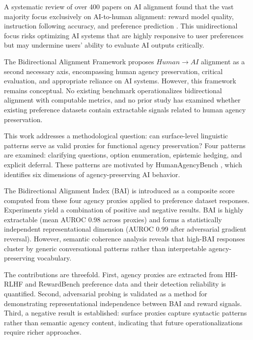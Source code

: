
A systematic review of over 400 papers on AI alignment found that the vast majority focus exclusively on AI-to-human alignment: reward model quality, instruction following accuracy, and preference prediction \citep{Shen2024}. This unidirectional focus risks optimizing AI systems that are highly responsive to user preferences but may undermine users' ability to evaluate AI outputs critically.

The Bidirectional Alignment Framework \citep{Shen2024} proposes $Human\rightarrow AI$ alignment as a second necessary axis, encompassing human agency preservation, critical evaluation, and appropriate reliance on AI systems. However, this framework remains conceptual. No existing benchmark operationalizes bidirectional alignment with computable metrics, and no prior study has examined whether existing preference datasets contain extractable signals related to human agency preservation.

This work addresses a methodological question: can surface-level linguistic patterns serve as valid proxies for functional agency preservation? Four patterns are examined: clarifying questions, option enumeration, epistemic hedging, and explicit deferral. These patterns are motivated by HumanAgencyBench \citep{HumanAgencyBench2024}, which identifies six dimensions of agency-preserving AI behavior.

The Bidirectional Alignment Index (BAI) is introduced as a composite score computed from these four agency proxies applied to preference dataset responses. Experiments yield a combination of positive and negative results. BAI is highly extractable (mean AUROC 0.98 across proxies) and forms a statistically independent representational dimension (AUROC 0.99 after adversarial gradient reversal). However, semantic coherence analysis reveals that high-BAI responses cluster by generic conversational patterns rather than interpretable agency-preserving vocabulary.

The contributions are threefold. First, agency proxies are extracted from HH-RLHF and RewardBench preference data and their detection reliability is quantified. Second, adversarial probing is validated as a method for demonstrating representational independence between BAI and reward signals. Third, a negative result is established: surface proxies capture syntactic patterns rather than semantic agency content, indicating that future operationalizations require richer approaches.
